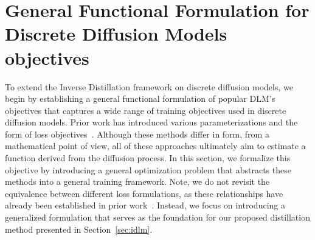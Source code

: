\section{General Functional Formulation for Discrete Diffusion Models objectives}
\label{app:unversal loss}
    To extend the Inverse Distillation framework on discrete diffusion models, we begin by establishing a general functional formulation of popular DLM's objectives that captures a wide range of training objectives used in discrete diffusion models. Prior work has introduced various parameterizations and the form of loss objectives~\citep{lou2024discrete,sahoo2024simple,schiff2024discreteguidance,sahoo2025the}. Although these methods differ in form, from a mathematical point of view, all of these approaches ultimately aim to estimate a function derived from the diffusion process. In this section, we formalize this objective by introducing a general optimization problem that abstracts these methods into a general training framework. Note, we do not revisit the equivalence between different loss formulations, as these relationships have already been established in prior work~\citep{sahoo2024simple, schiff2024discreteguidance}. Instead, we focus on introducing a generalized formulation that serves as the foundation for our proposed distillation method presented in Section~\ref{sec:idlm}. 
    
